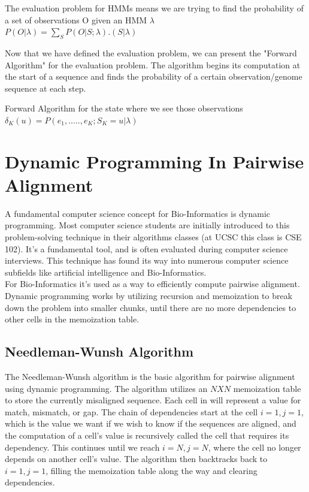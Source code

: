 \documentclass[12pt,journal,compsoc]{IEEEtran}
\begin{document}
\begin{center}
    The evaluation problem for HMMs means we are trying to find the probability of a set of observations O given an HMM $\lambda$ \\
    \begin{math} P(O\vert \displaystyle \lambda)=\sum_{S}P(O\vert S;\lambda).(S\vert \lambda)
    \end{math}
\end{center}

Now that we have defined the evaluation problem, we can present the "Forward Algorithm" for the evaluation problem. The algorithm begins its computation at the start of a sequence and finds the probability of a certain observation/genome sequence at each step.
\begin{center}

    Forward Algorithm for the state where we see those observations
    \begin{math} \delta_{K}(u)=P(e_{1},.\ldots.,e_{K};S_{K}=u\vert \lambda)
    \end{math}
    
\end{center}

\section{Dynamic Programming In Pairwise Alignment}
A fundamental computer science concept for Bio-Informatics is dynamic programming. Most computer science students are initially introduced to this problem-solving technique in their algorithms classes (at UCSC this class is CSE 102). It's a fundamental tool, and is often evaluated during computer science interviews. This technique has found its way into numerous computer science subfields like artificial intelligence and Bio-Informatics. \\
For Bio-Informatics it's used as a way to efficiently compute pairwise alignment. Dynamic programming works by utilizing recursion and memoization to break down the problem into smaller chunks, until there are no more dependencies to other cells in the memoization table.

\subsection{Needleman-Wunsh Algorithm}
The Needleman-Wunsh algorithm is the basic algorithm for pairwise alignment using dynamic programming. The algorithm utilizes an $N X N$ memoization table to store the currently misaligned sequence. Each cell in will represent a value for match, mismatch, or gap. The chain of dependencies start at the cell $i=1, j=1$, which is the value we want if we wish to know if the sequences are aligned, and the computation of a cell's value is recursively called the cell that requires its dependency. This continues until we reach $i=N, j=N$, where the cell no longer depends on another cell's value. The algorithm then backtracks back to $i=1, j=1$, filling the memoization table along the way and clearing dependencies.
\end{document}
